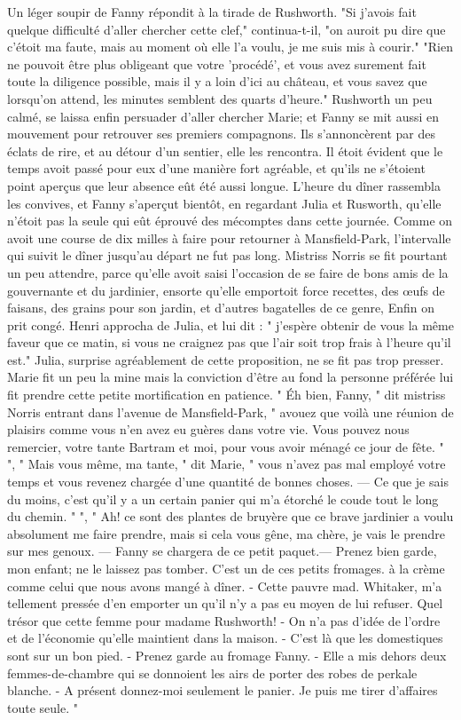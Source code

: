 Un léger soupir de Fanny répondit à la tirade de Rushworth.
"Si j'avois fait quelque difficulté d'aller chercher cette clef," continua-t-il, "on auroit pu dire que c'étoit ma faute, mais au moment où elle l'a voulu, je me suis mis à courir."
"Rien ne pouvoit être plus obligeant que\setcounter{page}{526} votre 'procédé', et vous avez surement fait toute la diligence possible, mais il y a loin d'ici au château, et vous savez que lorsqu'on attend, les minutes semblent des quarts d'heure."
Rushworth un peu calmé, se laissa enfin persuader d'aller chercher Marie; et Fanny se mit aussi en mouvement pour retrouver ses premiers compagnons. Ils s'annoncèrent par des éclats de rire, et au détour d'un sentier, elle les rencontra. Il étoit évident que le temps avoit passé pour eux d'une manière fort agréable, et qu'ils ne s'étoient point aperçus que leur absence eût été aussi longue.
L'heure du dîner rassembla les convives, et Fanny s'aperçut bientôt, en regardant Julia et Rusworth, qu'elle n'étoit pas la seule qui eût éprouvé des mécomptes dans cette journée.
Comme on avoit une course de dix milles à faire pour retourner à Mansfield-Park, l'intervalle qui suivit le dîner jusqu'au départ ne fut pas long. Mistriss Norris se fit pourtant un peu attendre, parce qu'elle avoit saisi l'occasion de se faire de bons amis de la gouvernante et du jardinier, ensorte qu'elle emportoit force recettes, des œufs de faisans, des grains pour son jardin, et d'autres bagatelles de ce genre, Enfin on prit congé. Henri\setcounter{page}{527} approcha de Julia, et lui dit : " j'espère obtenir de vous la même faveur que ce matin, si vous ne craignez pas que l'air soit trop frais à l'heure qu'il est." Julia, surprise agréablement de cette proposition, ne se fit pas trop presser. Marie fit un peu la mine mais la conviction d'être au fond la personne préférée lui fit prendre cette petite mortification en patience.
" Éh bien, Fanny, " dit mistriss Norris entrant dans l'avenue de Mansfield-Park, " avouez que voilà une réunion de plaisirs comme vous n'en avez eu guères dans votre vie. Vous pouvez nous remercier, votre tante Bartram et moi, pour vous avoir ménagé ce jour de fête. "
", " Mais vous même, ma tante, " dit Marie, " vous n'avez pas mal employé votre temps et vous revenez chargée d'une quantité de bonnes choses. — Ce que je sais du moins, c'est qu'il y a un certain panier qui m'a étorché le coude tout le long du chemin. "
", " Ah! ce sont des plantes de bruyère que ce brave jardinier a voulu absolument me faire prendre, mais si cela vous gêne, ma chère, je vais le prendre sur mes genoux. — Fanny se chargera de ce petit paquet.— Prenez bien garde, mon enfant; ne le laissez pas tomber. C'est un de ces petits fromages.\setcounter{page}{528} à la crème comme celui que nous avons mangé à dîner. - Cette pauvre mad. Whitaker, m'a tellement pressée d'en emporter un qu'il n'y a pas eu moyen de lui refuser. Quel trésor que cette femme pour madame Rushworth! - On n'a pas d'idée de l'ordre et de l'économie qu'elle maintient dans la maison. - C'est là que les domestiques sont sur un bon pied. - Prenez garde au fromage Fanny. - Elle a mis dehors deux femmes-de-chambre qui se donnoient les airs de porter des robes de perkale blanche. - A présent donnez-moi seulement le panier. Je puis me tirer d'affaires toute seule. "
